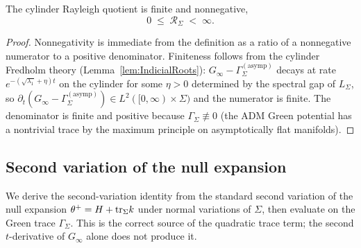 \begin{lemma}\label{lem:RayleighNonneg}
The cylinder Rayleigh quotient is finite and nonnegative,
\begin{equation}\label{eq:RayleighNonneg}
    0\;\le\;\mathcal R_\Sigma\;<\;\infty .
\end{equation}
\end{lemma}

\begin{proof}
Nonnegativity is immediate from the definition as a ratio of a nonnegative numerator to a positive denominator. Finiteness follows from the cylinder Fredholm theory (Lemma~\ref{lem:IndicialRoots}): $G_\infty-\Gamma_\Sigma^{(\mathrm{asymp})}$ decays at rate $e^{-(\sqrt{\lambda_1}+\eta)t}$ on the cylinder for some $\eta>0$ determined by the spectral gap of $L_\Sigma$, so $\partial_t(G_\infty-\Gamma_\Sigma^{(\mathrm{asymp})})\in L^2([0,\infty)\times\Sigma)$ and the numerator is finite. The denominator is finite and positive because $\Gamma_\Sigma\not\equiv0$ (the ADM Green potential has a nontrivial trace by the maximum principle on asymptotically flat manifolds).
\end{proof}

\subsection{Second variation of the null expansion}

We derive the second-variation identity from the standard second variation of the null expansion $\theta^+ = H + \mathrm{tr}_\Sigma k$ under normal variations of $\Sigma$, then evaluate on the Green trace $\Gamma_\Sigma$. This is the correct source of the quadratic trace term; the second $t$-derivative of $G_\infty$ alone does not produce it.

